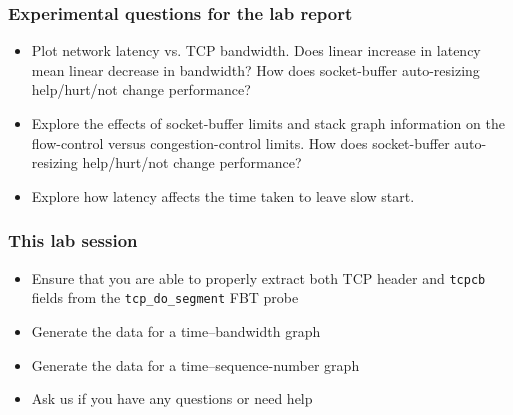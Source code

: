 \begin{frame}
  \frametitle{Experimental questions for the lab report}

  \begin{itemize}
    \item Plot network latency vs. TCP bandwidth.
      Does linear increase in latency mean linear decrease in bandwidth?
      How does socket-buffer auto-resizing help/hurt/not change performance?
    \item Explore the effects of socket-buffer limits and stack graph
      information on the flow-control versus congestion-control limits.
      How does socket-buffer auto-resizing help/hurt/not change performance?
    \item Explore how latency affects the time taken to leave slow start.
  \end{itemize}
\end{frame}

\begin{frame}
  \frametitle{This lab session}

  \begin{itemize}
    \item Ensure that you are able to properly extract both TCP header and
      \texttt{tcpcb} fields from the \texttt{tcp\_do\_segment} FBT probe
    \item Generate the data for a time--bandwidth graph
    \item Generate the data for a time--sequence-number graph
    \item Ask us if you have any questions or need help
  \end{itemize}
\end{frame}


